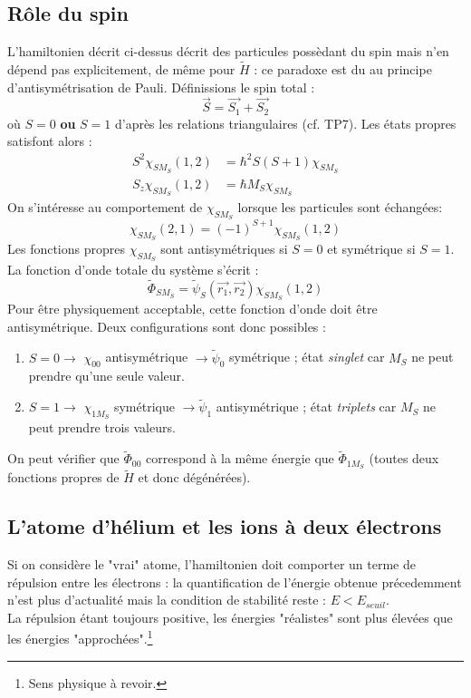 \documentclass	[11pt, a4paper, openany]{book}
\begin{document}
    \subsection{Rôle du spin}
    L'hamiltonien décrit ci-dessus décrit des particules possèdant du spin mais n'en 
    dépend pas explicitement, de même pour $\tilde{H}$ : ce paradoxe est du au principe
    d'antisymétrisation de Pauli. Définissions le spin total :
    \begin{equation}
    \vec{S}=\vec{S_1}+\vec{S_2}
    \end{equation}
    où $S=0$ \textbf{ou} $S=1$ d'après les relations triangulaires (cf. TP7). Les états 
    propres satisfont alors :
    \begin{equation}
    \begin{array}{ll}
    S^2\chi_{SM_S}(1,2) &= \hbar^2S(S+1)\chi_{SM_S}\\
    S_z\chi_{SM_S}(1,2) &= \hbar M_S\chi_{SM_S}    
    \end{array}
    \end{equation}
    On s'intéresse au comportement de $\chi_{SM_S}$ lorsque les particules sont échangées:
    \begin{equation}
    \chi_{SM_S}(2,1) = (-1)^{S+1}\chi_{SM_S}(1,2)
    \end{equation}
    Les fonctions propres $\chi_{SM_S}$ sont antisymétriques si $S=0$ et symétrique si 
    $S=1$. La fonction d'onde totale du système s'écrit :
    \begin{equation}
    \tilde{\Phi}_{SM_S} = \tilde{\psi}_S(\vec{r_1},\vec{r_2})\chi_{SM_S}(1,2)
    \end{equation}
    Pour \^etre physiquement acceptable, cette fonction d'onde doit \^etre antisymétrique.
    Deux configurations sont donc possibles :
    \begin{enumerate}
    \item $S=0 \rightarrow$ $\chi_{00}$ antisymétrique $\rightarrow \tilde{\psi}_0$ 
    symétrique ; état \textit{singlet} car $M_S$ ne peut prendre qu'une seule valeur.
    \item $S=1 \rightarrow$ $\chi_{1M_S}$ symétrique $\rightarrow \tilde{\psi}_1$ 
    antisymétrique ; état \textit{triplets} car $M_S$ ne peut prendre trois valeurs.
    \end{enumerate}
	On peut vérifier que $\tilde{\Phi}_{00}$ correspond à la même énergie que $\tilde{
	\Phi}_{1M_S}$ (toutes deux fonctions propres de $\tilde{H}$ et donc dégénérées).
	
	
	\subsection{L'atome d'hélium et les ions à deux électrons}
	Si on considère le "vrai" atome, l'hamiltonien doit comporter un terme de répulsion 
	entre les électrons : la quantification de l'énergie obtenue précedemment n'est plus
	d'actualité mais la condition de stabilité reste : $E<E_{seuil}$.\\
	La répulsion étant toujours positive, les énergies "réalistes" sont plus élevées que 
	les énergies "approchées".\footnote{Sens physique à revoir.}
	
\end{document}
